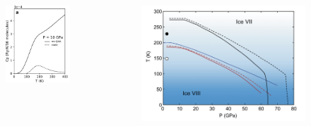 \documentclass[13pt,aspectratio=169]{beamer}
\begin{document}
\begin{frame}{\subsecname}
	\begin{columns}
		\begin{column}{0.45\textwidth}
			\begin{figure}
				\includegraphics[width=\columnwidth]{images/cp}%
			\end{figure}
		\end{column}

		\begin{column}{0.5\textwidth}
			\begin{figure}
				\includegraphics[width=\columnwidth]{images/boundary}%
			\end{figure}
		\end{column}
	\end{columns}
\end{frame}
\end{document}

